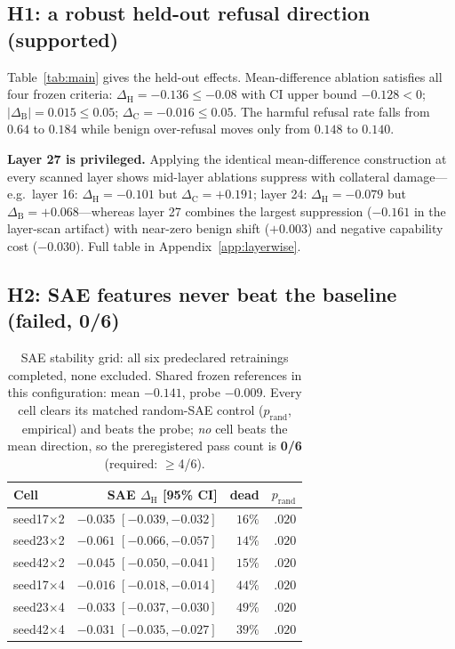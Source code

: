 \documentclass[11pt]{article}
\newcommand{\dH}{\ensuremath{\Delta_{\mathrm{H}}}}
\newcommand{\dB}{\ensuremath{\Delta_{\mathrm{B}}}}
\newcommand{\dC}{\ensuremath{\Delta_{\mathrm{C}}}}
\begin{document}
\subsection{H1: a robust held-out refusal direction (supported)}
\label{sec:h1}

Table~\ref{tab:main} gives the held-out effects.  Mean-difference ablation
satisfies all four frozen criteria: $\dH=-0.136\le-0.08$ with CI upper bound
$-0.128<0$; $|\dB|=0.015\le0.05$; $\dC=-0.016\le0.05$.  The harmful refusal
rate falls from $0.64$ to $0.184$ while benign over-refusal moves only from
$0.148$ to $0.140$.

\textbf{Layer 27 is privileged.}  Applying the identical mean-difference
construction at every scanned layer shows mid-layer ablations suppress with
collateral damage---e.g.\ layer 16: $\dH=-0.101$ but $\dC=+0.191$; layer 24:
$\dH=-0.079$ but $\dB=+0.068$---whereas layer 27 combines the largest
suppression ($-0.161$ in the layer-scan artifact) with near-zero benign shift
($+0.003$) and negative capability cost ($-0.030$).  Full table in
Appendix~\ref{app:layerwise}.

\subsection{H2: SAE features never beat the baseline (failed, 0/6)}
\label{sec:h2}

\begin{table}[t]
\centering
\small
\begin{tabular}{@{}lrrr@{}}
\toprule
Cell & SAE \dH{} [95\% CI] & dead & $p_{\mathrm{rand}}$ \\
\midrule
seed17$\times$2 & $-0.035$ $[-0.039,-0.032]$ & $16\%$ & $.020$ \\
seed23$\times$2 & $-0.061$ $[-0.066,-0.057]$ & $14\%$ & $.020$ \\
seed42$\times$2 & $-0.045$ $[-0.050,-0.041]$ & $15\%$ & $.020$ \\
seed17$\times$4 & $-0.016$ $[-0.018,-0.014]$ & $44\%$ & $.020$ \\
seed23$\times$4 & $-0.033$ $[-0.037,-0.030]$ & $49\%$ & $.020$ \\
seed42$\times$4 & $-0.031$ $[-0.035,-0.027]$ & $39\%$ & $.020$ \\
\bottomrule
\end{tabular}
\caption{SAE stability grid: all six predeclared retrainings completed, none
excluded.  Shared frozen references in this configuration: mean $-0.141$,
probe $-0.009$.  Every cell clears its matched random-SAE control
($p_{\mathrm{rand}}$, empirical) and beats the probe; \emph{no} cell beats the
mean direction, so the preregistered pass count is \textbf{0/6} (required:
$\ge$4/6).}
\label{tab:grid}
\end{table}
\end{document}
